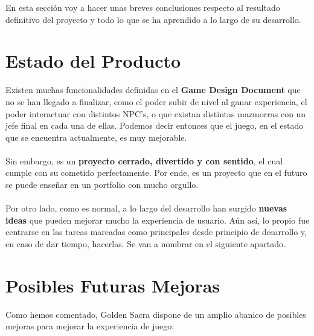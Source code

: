En esta sección voy a hacer unas breves conclusiones respecto al resultado definitivo del proyecto y todo lo que se ha aprendido a lo largo de su desarrollo.

\section{Estado del Producto}

Existen muchas funcionalidades definidas en el \textbf{Game Design Document} que no se han llegado a finalizar, como el poder subir de nivel al ganar experiencia, el poder interactuar con distintos NPC's, o que existan distintas mazmorras con un jefe final en cada una de ellas. Podemos decir entonces que el juego, en el estado que se encuentra actualmente, es muy mejorable. 
\\ \\
Sin embargo, es un \textbf{proyecto cerrado, divertido y con sentido}, el cual cumple con su cometido perfectamente. Por ende, es un proyecto que en el futuro se puede enseñar en un portfolio con mucho orgullo.
\\ \\
Por otro lado, como es normal, a lo largo del desarrollo han surgido \textbf{nuevas ideas} que pueden mejorar mucho la experiencia de usuario. Aún así, lo propio fue centrarse en las tareas marcadas como principales desde principio de desarrollo y, en caso de dar tiempo, hacerlas. Se van a nombrar en el siguiente apartado.

\section{Posibles Futuras Mejoras}

Como hemos comentado, Golden Sacra dispone de un amplio abanico de posibles mejoras para mejorar la experiencia de juego:

